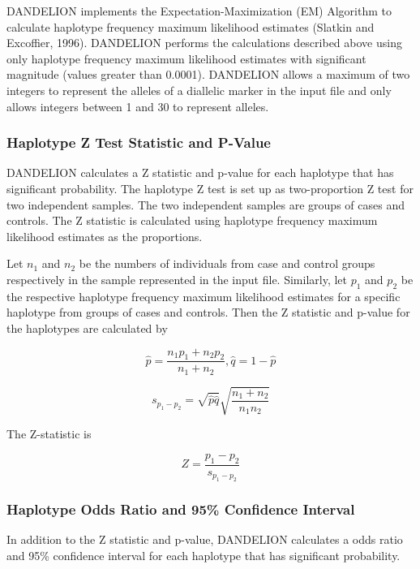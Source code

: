DANDELION implements the Expectation-Maximization (EM) Algorithm to calculate
haplotype frequency maximum likelihood estimates (Slatkin and Excoffier, 1996).
DANDELION performs the calculations described above using only haplotype
frequency maximum likelihood estimates with significant magnitude (values
greater than 0.0001).  DANDELION allows a maximum of two integers to represent
the alleles of a diallelic marker in the input file and only allows integers
between 1 and 30 to represent alleles.

\subsubsection{Haplotype Z Test Statistic and P-Value}
DANDELION calculates a Z statistic and p-value for each haplotype that has
significant probability.  The haplotype Z test is set up as two-proportion Z
test for two independent samples.  The two independent samples are groups of
cases and controls.  The Z statistic is calculated using haplotype frequency
maximum likelihood estimates as the proportions.

Let $n_1$ and $n_2$ be the numbers of individuals from case and control groups
respectively in the sample represented in the input file.  Similarly, let $p_1$
and $p_2$ be the respective haplotype frequency maximum likelihood estimates for
a specific haplotype from groups of cases and controls.  Then the Z statistic
and p-value for the haplotypes are calculated by

\begin{equation*}
  \hat{p} = \frac{n_1p_1 + n_2p_2}{n_1 + n_2}, \hat{q} = 1-\hat{p}
\end{equation*}

\begin{equation*}
  s_{p_1-p_2} = \sqrt{\hat{p}\hat{q}}\sqrt{\frac{n_1+n_2}{n_1n_2}}
\end{equation*}

The Z-statistic is 

\begin{equation*}
Z = \frac{p_1-p_2}{s_{p_1-p_2}}
\end{equation*}

\subsubsection{Haplotype Odds Ratio and 95\% Confidence Interval}

In addition to the Z statistic and p-value, DANDELION calculates a odds ratio
and 95\% confidence interval for each haplotype that has significant
probability.

